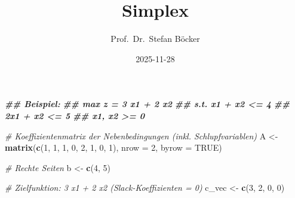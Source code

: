 \documentclass[
]{article}
\title{Simplex}
\author{Prof.~Dr.~Stefan Böcker}
\date{2025-11-28}
\newenvironment{Shaded}{\begin{snugshade}}{\end{snugshade}}
\newcommand{\AttributeTok}[1]{\textcolor[rgb]{0.13,0.29,0.53}{#1}}
\newcommand{\CommentTok}[1]{\textcolor[rgb]{0.56,0.35,0.01}{\textit{#1}}}
\newcommand{\ConstantTok}[1]{\textcolor[rgb]{0.56,0.35,0.01}{#1}}
\newcommand{\DecValTok}[1]{\textcolor[rgb]{0.00,0.00,0.81}{#1}}
\newcommand{\DocumentationTok}[1]{\textcolor[rgb]{0.56,0.35,0.01}{\textbf{\textit{#1}}}}
\newcommand{\FunctionTok}[1]{\textcolor[rgb]{0.13,0.29,0.53}{\textbf{#1}}}
\newcommand{\NormalTok}[1]{#1}
\newcommand{\OtherTok}[1]{\textcolor[rgb]{0.56,0.35,0.01}{#1}}
\begin{document}
\maketitle

\begin{Shaded}
\begin{Highlighting}[]
\DocumentationTok{\#\# Beispiel:}
\DocumentationTok{\#\# max z = 3 x1 + 2 x2}
\DocumentationTok{\#\# s.t.  x1 + x2 \textless{}= 4}
\DocumentationTok{\#\#      2x1 + x2 \textless{}= 5}
\DocumentationTok{\#\#      x1, x2 \textgreater{}= 0}

\CommentTok{\# Koeffizientenmatrix der Nebenbedingungen (inkl. Schlupfvariablen)}
\NormalTok{A }\OtherTok{\textless{}{-}} \FunctionTok{matrix}\NormalTok{(}\FunctionTok{c}\NormalTok{(}\DecValTok{1}\NormalTok{, }\DecValTok{1}\NormalTok{, }\DecValTok{1}\NormalTok{, }\DecValTok{0}\NormalTok{,}
              \DecValTok{2}\NormalTok{, }\DecValTok{1}\NormalTok{, }\DecValTok{0}\NormalTok{, }\DecValTok{1}\NormalTok{),}
            \AttributeTok{nrow =} \DecValTok{2}\NormalTok{, }\AttributeTok{byrow =} \ConstantTok{TRUE}\NormalTok{)}

\CommentTok{\# Rechte Seiten}
\NormalTok{b }\OtherTok{\textless{}{-}} \FunctionTok{c}\NormalTok{(}\DecValTok{4}\NormalTok{, }\DecValTok{5}\NormalTok{)}

\CommentTok{\# Zielfunktion: 3 x1 + 2 x2  (Slack{-}Koeffizienten = 0)}
\NormalTok{c\_vec }\OtherTok{\textless{}{-}} \FunctionTok{c}\NormalTok{(}\DecValTok{3}\NormalTok{, }\DecValTok{2}\NormalTok{, }\DecValTok{0}\NormalTok{, }\DecValTok{0}\NormalTok{)}


\end{Highlighting}
\end{Shaded}
\end{document}
